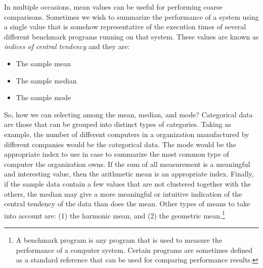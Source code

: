 \documentclass[openany, a4paper]{book}
\theoremstyle{break}
\theoremstyle{example}
\theoremstyle{note}
\theoremstyle{break}
\theoremstyle{exercise}
\begin{document}
In multiple occasions, mean values can be useful for performing coarse
comparisons. Sometimes we wish to summarize the performance of a system using
a single value that is somehow representative of the execution times of
several different benchmark programs running on that system. These values are
known as \emph{indices of central tendency} and they are:

\begin{itemize}
\item The sample mean
\item The sample median
\item The sample mode
\end{itemize}

So, how we can selecting among the mean, median, and mode? Categorical data
are those that can be grouped into distinct types of categories. Taking as
example, the number of different computers in a organization manufactured by
different companies would be the categorical data. The mode would be the
appropriate index to use in case to summarize the most common type of
computer the organization owns. If the sum of all measurement is a meaningful
and interesting value, then the arithmetic mean is an appropriate
index. Finally, if the sample data contain a few values that are not
clustered together with the others, the median may give a more meaningful or
intuitive indication of the central tendency of the data than does the
mean. Other types of means to take into account are: (1) the harmonic mean,
and (2) the geometric mean.\footnote{A benchmark program is any program that is used to measure the
performance of a computer system. Certain programs are sometimes defined as a
standard reference that can be used for comparing performance results.}
\end{document}
